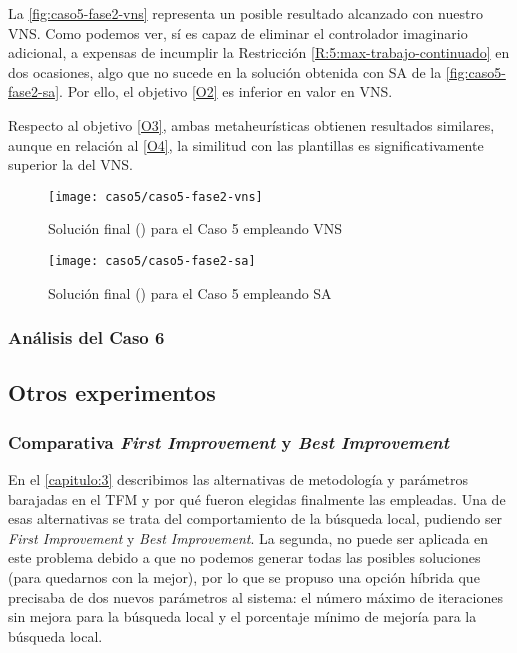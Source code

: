La \autoref{fig:caso5-fase2-vns} representa un posible resultado alcanzado con nuestro VNS. Como podemos ver, sí es capaz de eliminar el controlador imaginario adicional, a expensas de incumplir la Restricción \ref{R:5:max-trabajo-continuado} en dos ocasiones, algo que no sucede en la solución obtenida con SA de la \autoref{fig:caso5-fase2-sa}. Por ello, el objetivo \ref{O2} es inferior en valor en VNS.

Respecto al objetivo \ref{O3}, ambas metaheurísticas obtienen resultados similares, aunque en relación al \ref{O4}, la similitud con las plantillas es significativamente superior la del VNS.

\begin{figure}[!]
	\centering
	\texttt{[image: caso5/caso5-fase2-vns]}
	\caption{Solución final (\fasedos{}) para el Caso 5 empleando VNS}
	\label{fig:caso5-fase2-vns}
\end{figure}

\begin{figure}[!]
	\centering
	\texttt{[image: caso5/caso5-fase2-sa]}
	\caption{Solución final (\fasedos{}) para el Caso 5 empleando SA}
	\label{fig:caso5-fase2-sa}
\end{figure}
\subsubsection{Análisis del Caso 6}


\subsection{Otros experimentos}

\subsubsection{Comparativa \textit{First Improvement} y \textit{Best Improvement}}

En el \autoref{capitulo:3} describimos las alternativas de metodología y parámetros barajadas en el TFM y por qué fueron elegidas finalmente las empleadas. Una de esas alternativas se trata del comportamiento de la búsqueda local, pudiendo ser \textit{First Improvement} y \textit{Best Improvement}. La segunda, no puede ser aplicada en este problema debido a que no podemos generar todas las posibles soluciones (para quedarnos con la mejor), por lo que se propuso una opción híbrida que precisaba de dos nuevos parámetros al sistema: el número máximo de iteraciones sin mejora para la búsqueda local y el porcentaje mínimo de mejoría para la búsqueda local.

